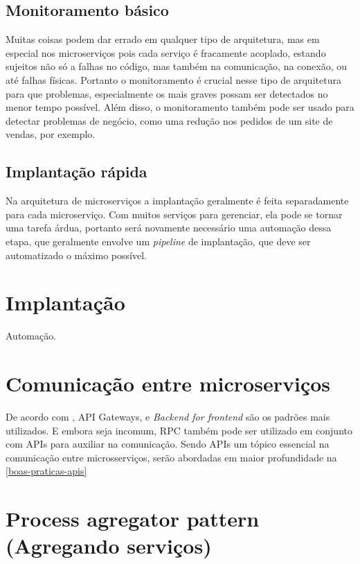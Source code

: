 \subsection{Monitoramento básico}

Muitas coisas podem dar errado em qualquer tipo de arquitetura, mas em especial nos microserviços pois cada serviço é fracamente acoplado, estando sujeitos não só a falhas no código, mas também na comunicação, na conexão, ou até falhas físicas. Portanto o monitoramento é crucial nesse tipo de arquitetura para que problemas, especialmente os mais graves possam ser detectados no menor tempo possível. Além disso, o monitoramento também pode ser usado para detectar problemas de negócio, como uma redução nos pedidos de um site de vendas, por exemplo. \cite{MartinFowlerMicroservices}

\subsection{Implantação rápida}

Na arquitetura de microserviços a implantação geralmente é feita separadamente para cada microserviço. Com muitos serviços para gerenciar, ela pode se tornar uma tarefa árdua, portanto será novamente necessário uma automação dessa etapa, que geralmente envolve um \emph{pipeline} de implantação, que deve ser automatizado o máximo possível. \cite{MartinFowlerMicroservices}

\section{Implantação}

Automação.

\section{Comunicação entre microserviços}

De acordo com , API Gateways, e \emph{Backend for frontend} são os padrões mais utilizados. E embora seja incomum, RPC também pode ser utilizado em conjunto com APIs para auxiliar na comunicação. Sendo APIs um tópico essencial na comunicação entre microsserviços, serão abordadas em maior profundidade na \autoref{boas-praticas-apis}

\section{Process agregator pattern (Agregando serviços)}

